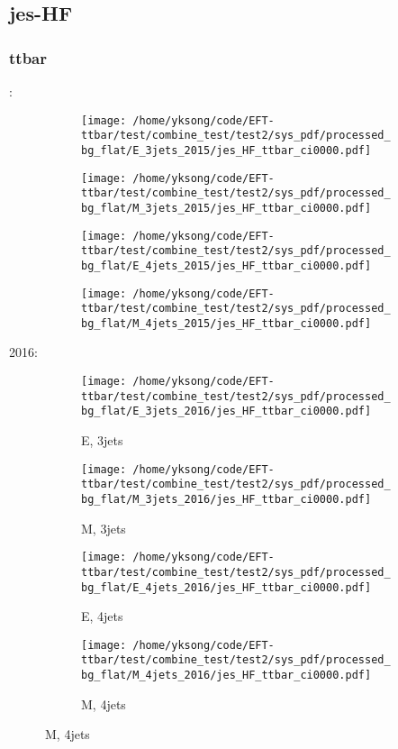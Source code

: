 \documentclass{beamer}
\begin{document}
\subsection{jes-HF}

\begin{frame}
\frametitle{ttbar}
\fontsize{5}{1}:
\begin{figure}
\centering
\begin{subfigure}[b]{0.24\textwidth}
\texttt{[image: /home/yksong/code/EFT-ttbar/test/combine\_test/test2/sys\_pdf/processed\_bg\_flat/E\_3jets\_2015/jes\_HF\_ttbar\_ci0000.pdf]}
\end{subfigure}
\begin{subfigure}[b]{0.24\textwidth}
\texttt{[image: /home/yksong/code/EFT-ttbar/test/combine\_test/test2/sys\_pdf/processed\_bg\_flat/M\_3jets\_2015/jes\_HF\_ttbar\_ci0000.pdf]}
\end{subfigure}
\begin{subfigure}[b]{0.24\textwidth}
\texttt{[image: /home/yksong/code/EFT-ttbar/test/combine\_test/test2/sys\_pdf/processed\_bg\_flat/E\_4jets\_2015/jes\_HF\_ttbar\_ci0000.pdf]}
\end{subfigure}
\begin{subfigure}[b]{0.24\textwidth}
\texttt{[image: /home/yksong/code/EFT-ttbar/test/combine\_test/test2/sys\_pdf/processed\_bg\_flat/M\_4jets\_2015/jes\_HF\_ttbar\_ci0000.pdf]}
\end{subfigure}
\end{figure}
2016:
\begin{figure}
\centering
\begin{subfigure}[b]{0.24\textwidth}
\texttt{[image: /home/yksong/code/EFT-ttbar/test/combine\_test/test2/sys\_pdf/processed\_bg\_flat/E\_3jets\_2016/jes\_HF\_ttbar\_ci0000.pdf]}
\captionsetup{font=tiny}
\caption{E, 3jets}
\end{subfigure}
\begin{subfigure}[b]{0.24\textwidth}
\texttt{[image: /home/yksong/code/EFT-ttbar/test/combine\_test/test2/sys\_pdf/processed\_bg\_flat/M\_3jets\_2016/jes\_HF\_ttbar\_ci0000.pdf]}
\captionsetup{font=tiny}
\caption{M, 3jets}
\end{subfigure}
\begin{subfigure}[b]{0.24\textwidth}
\texttt{[image: /home/yksong/code/EFT-ttbar/test/combine\_test/test2/sys\_pdf/processed\_bg\_flat/E\_4jets\_2016/jes\_HF\_ttbar\_ci0000.pdf]}
\captionsetup{font=tiny}
\caption{E, 4jets}
\end{subfigure}
\begin{subfigure}[b]{0.24\textwidth}
\texttt{[image: /home/yksong/code/EFT-ttbar/test/combine\_test/test2/sys\_pdf/processed\_bg\_flat/M\_4jets\_2016/jes\_HF\_ttbar\_ci0000.pdf]}
\captionsetup{font=tiny}
\caption{M, 4jets}
\end{subfigure}
\end{figure}
\end{frame}
\end{document}
